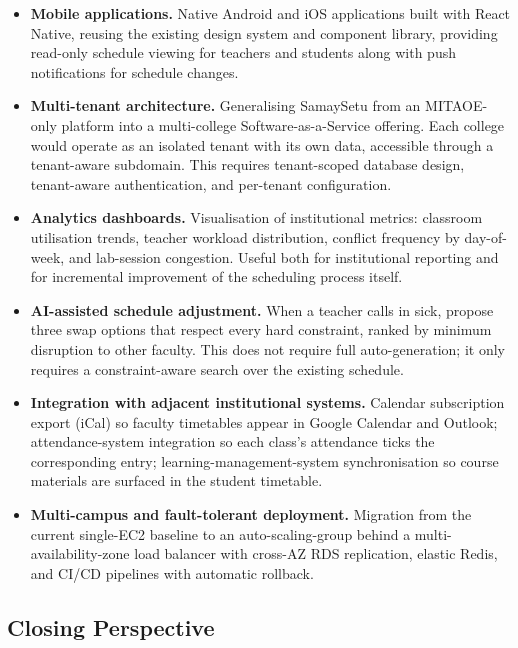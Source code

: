\begin{itemize}
    \item \textbf{Mobile applications.} Native Android and iOS applications built with React Native, reusing the existing design system and component library, providing read-only schedule viewing for teachers and students along with push notifications for schedule changes.

    \item \textbf{Multi-tenant architecture.} Generalising SamaySetu from an MITAOE-only platform into a multi-college Software-as-a-Service offering. Each college would operate as an isolated tenant with its own data, accessible through a tenant-aware subdomain. This requires tenant-scoped database design, tenant-aware authentication, and per-tenant configuration.

    \item \textbf{Analytics dashboards.} Visualisation of institutional metrics: classroom utilisation trends, teacher workload distribution, conflict frequency by day-of-week, and lab-session congestion. Useful both for institutional reporting and for incremental improvement of the scheduling process itself.

    \item \textbf{AI-assisted schedule adjustment.} When a teacher calls in sick, propose three swap options that respect every hard constraint, ranked by minimum disruption to other faculty. This does not require full auto-generation; it only requires a constraint-aware search over the existing schedule.

    \item \textbf{Integration with adjacent institutional systems.} Calendar subscription export (iCal) so faculty timetables appear in Google Calendar and Outlook; attendance-system integration so each class's attendance ticks the corresponding entry; learning-management-system synchronisation so course materials are surfaced in the student timetable.

    \item \textbf{Multi-campus and fault-tolerant deployment.} Migration from the current single-EC2 baseline to an auto-scaling-group behind a multi-availability-zone load balancer with cross-AZ RDS replication, elastic Redis, and CI/CD pipelines with automatic rollback.
\end{itemize}

\subsection{Closing Perspective}

